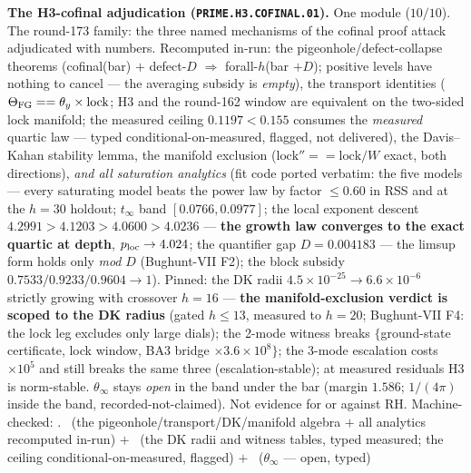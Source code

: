 \documentclass[11pt,a4paper]{article}
\theoremstyle{definition}
\begin{document}
\par\smallskip\noindent\textbf{The H3-cofinal adjudication
(\texttt{PRIME.\allowbreak H3.\allowbreak COFINAL.01}).}
One module ($10/10$).  The round-173 family: the three named
mechanisms of the cofinal proof attack adjudicated with numbers.
Recomputed in-run: the pigeonhole/defect-collapse theorems
(cofinal(bar) $+$ defect-$D$ $\Rightarrow$ forall-$h$(bar $+
D$); positive levels have nothing to cancel --- the averaging
subsidy is \emph{empty}), the transport identities ($\Theta_{\rm
FG} == \theta_y \times \mathrm{lock}$; H3 and the round-162
window are equivalent on the two-sided lock manifold; the
measured ceiling $0.1197 < 0.155$ consumes the
 \emph{measured}
quartic law --- typed conditional-on-measured, flagged, not
delivered), the Davis--Kahan stability lemma, the manifold
exclusion ($\mathrm{lock}'' == \mathrm{lock}/W$ exact, both
directions), \emph{and all saturation analytics} (fit code
ported verbatim: the five models --- every saturating model
beats the power law by factor $\le 0.60$ in RSS and at the
$h = 30$ holdout; $t_\infty$ band $[0.0766, 0.0977]$; the local
exponent descent $4.2991 > 4.1203 > 4.0600 > 4.0236$ ---
\textbf{the growth law converges to the exact quartic at depth},
$p_{\rm loc} \to 4.024$; the quantifier gap $D = 0.004183$ ---
the limsup form holds only \emph{mod} $D$ (Bughunt-VII F2); the
block subsidy $0.7533/0.9233/0.9604 \to 1$).  Pinned: the DK
radii $4.5\times10^{-25} \to 6.6\times10^{-6}$ strictly growing
with crossover $h = 16$ --- \textbf{the manifold-exclusion
verdict is scoped to the DK radius} (gated $h \le 13$, measured
to $h = 20$; Bughunt-VII F4: the lock leg excludes only large
dials); the 2-mode witness breaks $\{$ground-state certificate,
lock window, BA3 bridge $\times 3.6\times10^{8}\}$; the 3-mode
escalation costs $\times 10^{5}$ and still breaks the same three
(escalation-stable); at measured residuals H3 is norm-stable.
$\theta_\infty$ stays \emph{open} in the band under the bar
(margin $1.586$; $1/(4\pi)$ inside the band,
recorded-not-claimed).  Not evidence for or against RH.
Machine-checked: .
\mE\ (the pigeonhole/transport/DK/manifold algebra $+$ all
analytics recomputed in-run) $+$ \mC\ (the DK radii and witness
tables, typed measured; the ceiling conditional-on-measured,
flagged) $+$ \mO\ ($\theta_\infty$ --- open, typed)
\par\smallskip
\end{document}
